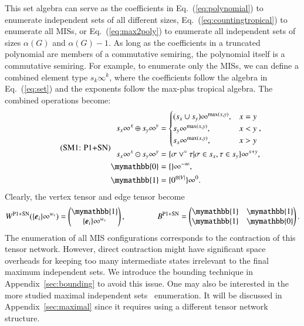 \documentclass[onefignum, onetabnum]{siamart190516}
\newcommand{\eqname}[1]{\stepcounter{equation}\tag{\theequation : #1}}
\newcommand{\<}{\langle}
\renewcommand{\>}{\rangle}
\newcommand{\Eq}[1]{Eq.~(\ref{#1})}
\newcommand{\App}[1]{Appendix~\ref{#1}}
\newcounter{example}
\begin{document}
This set algebra can serve as the coefficients in \Eq{eq:polynomial} to enumerate independent sets of all different sizes, \Eq{eq:countingtropical} to enumerate all MISs, or \Eq{eq:max2poly} to enumerate all independent sets of sizes $\alpha(G)$ and $\alpha(G)-1$.
As long as the coefficients in a truncated polynomial are members of a commutative semiring, the polynomial itself is a commutative semiring.
For example, to enumerate only the MISs, we can define a combined element type $s_{k}\infty^k$, where the coefficients follow the algebra in \Eq{eq:set} and the exponents follow the max-plus tropical algebra.
The combined operations become: 
\begin{equation}
\eqname{P1+SN}
\begin{split}
    s_x\infty^x \oplus s_y\infty^y &= \begin{cases}
        (s_x \cup s_y)\infty^{\max(x,y)}, & x = y\\
        s_y\infty^{\max(x,y)}, & x < y\\
        s_x\infty^{\max(x,y)}, & x > y
    \end{cases},\\
    s_x\infty^x \odot s_y\infty^y &= \{\sigma \lor^\circ \tau | \sigma \in s_x, \tau \in s_y\}\infty^{x+y},\\
    \mymathbb{0} &= \{\}\infty^{-\infty},\\
    \mymathbb{1} &= \{0^{\otimes |V|}\}\infty^{0}. \label{eq:countingtropicalset}
\end{split}
\end{equation}
Clearly, the vertex tensor and edge tensor become
\begin{equation}
    W^{\rm P1+SN}(\{\boldsymbol{e}_{i}\}\infty^{w_v}) = \left(\begin{matrix}
        \mymathbb{1} \\
        \{\boldsymbol{e}_{i}\}\infty^{w_v}
    \end{matrix}\right),   
    \qquad \qquad
        B^{\rm P1+SN} = \left(\begin{matrix}
        \mymathbb{1}  & \mymathbb{1} \\
        \mymathbb{1} & \mymathbb{0}
    \end{matrix}\right).
\end{equation}
The enumeration of all MIS configurations corresponds to the contraction of this tensor network.
However, direct contraction might have significant space overheads for keeping too many intermediate states irrelevant to the final maximum independent sets.
We introduce the bounding technique in \App{sec:bounding} to avoid this issue.
One may also be interested in the more studied maximal independent sets~\cite{Bron1973, Eppstein2010, Johnson1988} enumeration.
It will be discussed in \App{sec:maximal} since it requires using a different tensor network structure.
\end{document}
